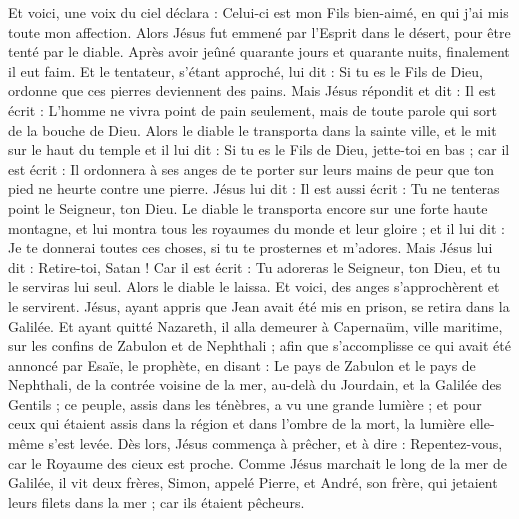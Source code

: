 \begin{multicols}{2}
Et voici, une voix du ciel déclara : Celui-ci est mon Fils bien-aimé, en qui j'ai mis toute mon affection.
\VerseOne{}Alors Jésus fut emmené par l'Esprit dans le désert, pour être tenté par le diable.
Après avoir jeûné quarante jours et quarante nuits, finalement il eut faim.
Et le tentateur, s'étant approché, lui dit : Si tu es le Fils de Dieu, ordonne que ces pierres deviennent des pains.
Mais Jésus répondit et dit : Il est écrit : L'homme ne vivra point de pain seulement, mais de toute parole qui sort de la bouche de Dieu.
Alors le diable le transporta dans la sainte ville, et le mit sur le haut du temple
et il lui dit : Si tu es le Fils de Dieu, jette-toi en bas ; car il est écrit : Il ordonnera à ses anges de te porter sur leurs mains de peur que ton pied ne heurte contre une pierre.
Jésus lui dit : Il est aussi écrit : Tu ne tenteras point le Seigneur, ton Dieu.
Le diable le transporta encore sur une forte haute montagne, et lui montra tous les royaumes du monde et leur gloire ;
et il lui dit : Je te donnerai toutes ces choses, si tu te prosternes et m'adores.
Mais Jésus lui dit : Retire-toi, Satan ! Car il est écrit : Tu adoreras le Seigneur, ton Dieu, et tu le serviras lui seul.
Alors le diable le laissa. Et voici, des anges s'approchèrent et le servirent.
Jésus, ayant appris que Jean avait été mis en prison, se retira dans la Galilée.
Et ayant quitté Nazareth, il alla demeurer à Capernaüm, ville maritime, sur les confins de Zabulon et de Nephthali ;
afin que s'accomplisse ce qui avait été annoncé par Esaïe, le prophète, en disant :
Le pays de Zabulon et le pays de Nephthali, de la contrée voisine de la mer, au-delà du Jourdain, et la Galilée des Gentils ;
ce peuple, assis dans les ténèbres, a vu une grande lumière ; et pour ceux qui étaient assis dans la région et dans l'ombre de la mort, la lumière elle-même s'est levée.
Dès lors, Jésus commença à prêcher, et à dire : Repentez-vous, car le Royaume des cieux est proche.
Comme Jésus marchait le long de la mer de Galilée, il vit deux frères, Simon, appelé Pierre, et André, son frère, qui jetaient leurs filets dans la mer ; car ils étaient pêcheurs.

\end{multicols}
